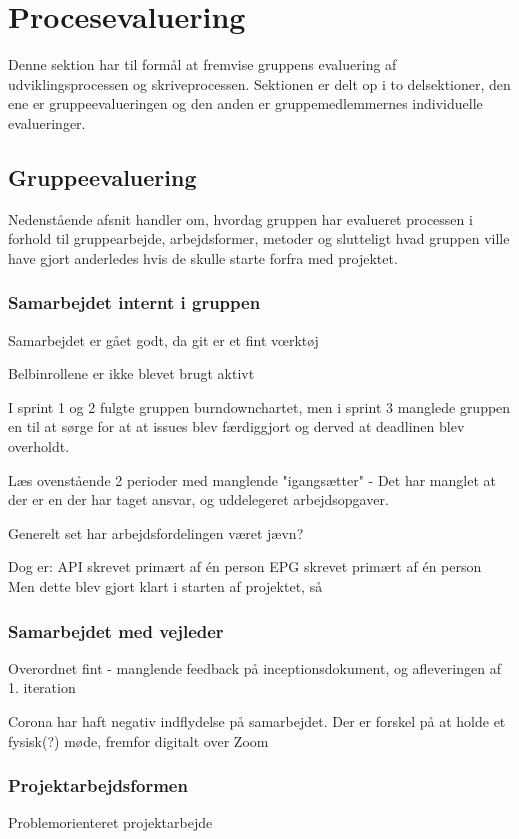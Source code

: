 \section{Procesevaluering}
Denne sektion har til formål at fremvise gruppens evaluering af udviklingsprocessen og skriveprocessen. Sektionen er delt op i to delsektioner, den ene er gruppeevalueringen og den anden er gruppemedlemmernes individuelle evalueringer. 

\subsection{Gruppeevaluering}
Nedenstående afsnit handler om, hvordag gruppen har evalueret processen i forhold til gruppearbejde, arbejdsformer, metoder og slutteligt hvad gruppen ville have gjort anderledes hvis de skulle starte forfra med projektet.

\subsubsection{Samarbejdet internt i gruppen}
Samarbejdet er gået godt, da git er et fint vœrktøj


Belbinrollene er ikke blevet brugt aktivt

I sprint 1 og 2 fulgte gruppen burndownchartet, men i sprint 3 manglede gruppen en til at sørge for at at issues blev færdiggjort og derved at deadlinen blev overholdt. 

Læs ovenstående
2 perioder med manglende "igangsætter" - Det har manglet at der er en der har taget ansvar, og uddelegeret arbejdsopgaver. 

Generelt set har arbejdsfordelingen været jævn? 

Dog er:
API skrevet primært af én person
EPG skrevet primært af én person
Men dette blev gjort klart i starten af projektet, så 


\subsubsection{Samarbejdet med vejleder}
Overordnet fint - manglende feedback på inceptionsdokument, og afleveringen af 1. iteration

Corona har haft negativ indflydelse på samarbejdet. 
Der er forskel på at holde et fysisk(?) møde, fremfor digitalt over Zoom


\subsubsection{Projektarbejdsformen}
Problemorienteret projektarbejde


